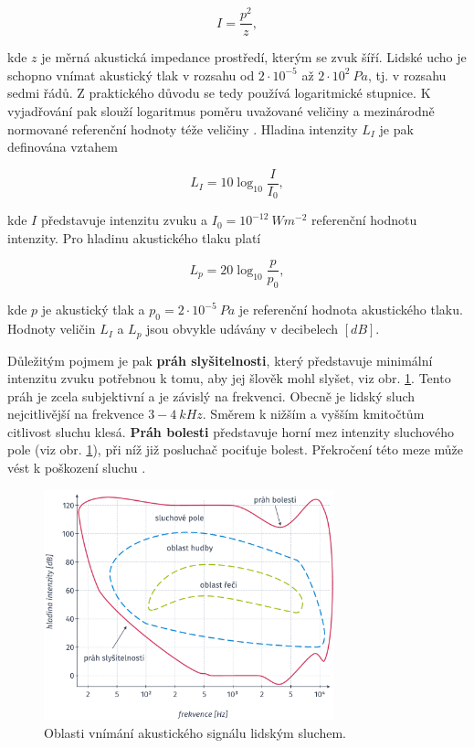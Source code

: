 \begin{equation}
  I = \frac{p^{2}}{z},
  \label{eq:asr:mfcc:intesity}
\end{equation}

\noindent kde $z$ je měrná akustická impedance prostředí, kterým se zvuk šíří. Lidské ucho je schopno vnímat akustický tlak v rozsahu od $2\cdot10^{-5}$ až $2\cdot10^{2}\ Pa$, tj. v rozsahu sedmi řádů. Z praktického důvodu se tedy používá logaritmické stupnice. K vyjadřování pak slouží logaritmus poměru uvažované veličiny a mezinárodně normované referenční hodnoty téže veličiny \cite{Psutka2006}. Hladina intenzity $L_{I}$ je pak definována vztahem

\begin{equation}
  L_{I} = 10\log_{10}\frac{I}{I_{0}},
  \label{eq:asr:mfcc:intesity:level}
\end{equation}

\noindent kde $I$ představuje intenzitu zvuku a $I_{0} = 10^{-12}\ Wm^{-2}$ referenční hodnotu intenzity. Pro hladinu akustického tlaku platí

\begin{equation}
  L_{p} = 20\log_{10}\frac{p}{p_{0}},
  \label{eq:asr:mfcc:pressure:level}
\end{equation}

\noindent kde $p$ je akustický tlak a $p_{0} = 2\cdot10^{-5}\ Pa$ je referenční hodnota akustického tlaku. Hodnoty veličin $L_{I}$ a $L_{p}$ jsou obvykle udávány v decibelech $\left[dB\right]$.

Důležitým pojmem je pak \textbf{práh slyšitelnosti}, který představuje minimální intenzitu zvuku potřebnou k tomu, aby jej šlověk mohl slyšet, viz obr. \ref{fig:asr:mfcc:acoustic:characteristic}. Tento práh je zcela subjektivní a je závislý na frekvenci. Obecně je lidský sluch nejcitlivější na frekvence $3 - 4\ kHz$. Směrem k nižším a vyšším kmitočtům citlivost sluchu klesá. \textbf{Práh bolesti} představuje horní mez intenzity sluchového pole (viz obr. \ref{fig:asr:mfcc:acoustic:characteristic}), při níž již posluchač pociťuje bolest. Překročení této meze může vést k poškození sluchu \cite{Holmes2001}.

\begin{figure}[hbpt]
  \centering
  \includegraphics[width=0.75\textwidth]{./ch4-asr/img/listening_perception.pdf}
  \caption{Oblasti vnímání akustického signálu lidským sluchem.}
  \label{fig:asr:mfcc:acoustic:characteristic}
\end{figure}

